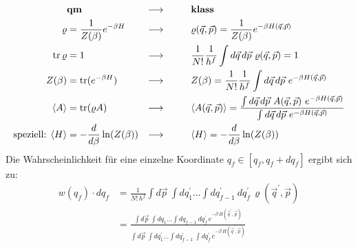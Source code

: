 \begin{align}
    &\textbf{qm} &\longrightarrow \hspace{1cm} &\textbf{klass}\\
    \varrho &= \frac{1}{Z(\beta)} e^{-\beta H} &\longrightarrow \hspace{1cm}& \varrho(\Vec{q},\Vec{p}) = \frac{1}{Z(\beta)} e^{-\beta H(\Vec{q},\Vec{p})} \\
    \trace\varrho &=1 &\longrightarrow\hspace{1cm} &  \frac{1}{N!} \frac{1}{h^f} \int d\Vec{q} \, d\Vec{p} \ \varrho(\Vec{q}, \Vec{p}) =1 \\
    Z(\beta)&= \trace (e^{-\beta H}) &\longrightarrow\hspace{1cm} & Z(\beta) = \frac{1}{N!} \frac{1}{h^f} \int d\Vec{q} \, d\Vec{p} \ e^{- \beta H(\Vec{q},\Vec{p})} \\
    \langle A \rangle &= \trace(\varrho A) & \longrightarrow \hspace{1cm}& \langle A(\Vec{q}, \Vec{p}) \rangle = \frac{\int d\Vec{q} \, d\Vec{p} \ A(\Vec{q}, \Vec{p}) \ e^{- \beta H(\Vec{q},\Vec{p})} }{\int d\Vec{q} \, d\Vec{p} \ e^{- \beta H(\Vec{q},\Vec{p})}} \\
    \text{speziell: } \langle H \rangle &= - \frac{d}{d \beta} \ln(Z(\beta)) & \longrightarrow \hspace{1cm}&\langle H \rangle = - \frac{d}{d \beta} \ln(Z(\beta)) 
\end{align}
Die Wahrscheinlichkeit für eine einzelne Koordinate $q_f \in [q_f, q_f + dq_f]$ ergibt sich zu:
\begin{align}
    w(q_f) \cdot dq_f &= \frac{1}{N! \, h^f} \int d\Vec{p} \ \int dq_1^{\prime} \dots \int dq_{f-1}^{\prime} \ dq_f^{\prime} \, \varrho(\Vec{q}^{\prime}, \Vec{p}) \\
    &= \frac{\int d\Vec{p} \ \int dq_1 \dots \int dq_{f-1} \ dq_f^{\prime} \, e^{- \beta \, H(\Vec{q}^{\prime}, \Vec{p})}}{\int d\Vec{p} \ \int dq_1^{\prime} \dots \int dq_{f-1}^{\prime} \ \int dq_f^{\prime} \, e^{- \beta \, H(\Vec{q}^{\prime}, \Vec{p})}}
\end{align}



